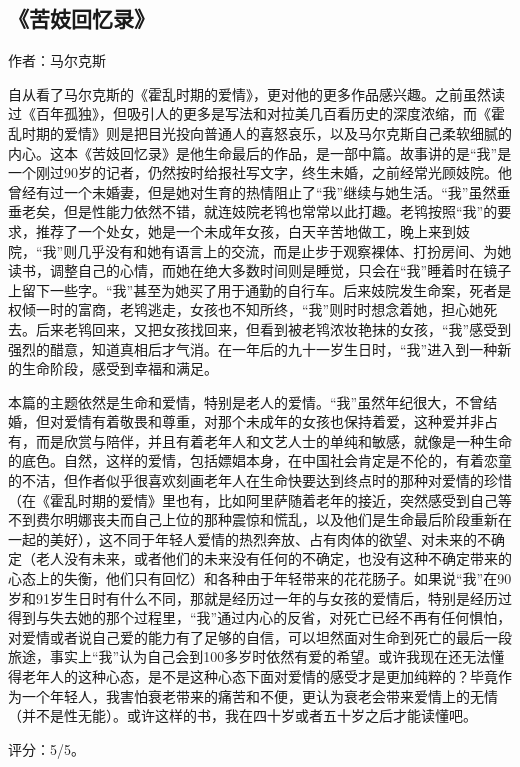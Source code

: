 \subsection{《苦妓回忆录》}

作者：马尔克斯

自从看了马尔克斯的《霍乱时期的爱情》，更对他的更多作品感兴趣。之前虽然读过《百年孤独》，但吸引人的更多是写法和对拉美几百看历史的深度浓缩，而《霍乱时期的爱情》则是把目光投向普通人的喜怒哀乐，以及马尔克斯自己柔软细腻的内心。这本《苦妓回忆录》是他生命最后的作品，是一部中篇。故事讲的是“我”是一个刚过90岁的记者，仍然按时给报社写文字，终生未婚，之前经常光顾妓院。他曾经有过一个未婚妻，但是她对生育的热情阻止了“我”继续与她生活。“我”虽然垂垂老矣，但是性能力依然不错，就连妓院老鸨也常常以此打趣。老鸨按照“我”的要求，推荐了一个处女，她是一个未成年女孩，白天辛苦地做工，晚上来到妓院，“我”则几乎没有和她有语言上的交流，而是止步于观察裸体、打扮房间、为她读书，调整自己的心情，而她在绝大多数时间则是睡觉，只会在“我”睡着时在镜子上留下一些字。“我”甚至为她买了用于通勤的自行车。后来妓院发生命案，死者是权倾一时的富商，老鸨逃走，女孩也不知所终，“我”则时时想念着她，担心她死去。后来老鸨回来，又把女孩找回来，但看到被老鸨浓妆艳抹的女孩，“我”感受到强烈的醋意，知道真相后才气消。在一年后的九十一岁生日时，“我”进入到一种新的生命阶段，感受到幸福和满足。

本篇的主题依然是生命和爱情，特别是老人的爱情。“我”虽然年纪很大，不曾结婚，但对爱情有着敬畏和尊重，对那个未成年的女孩也保持着爱，这种爱并非占有，而是欣赏与陪伴，并且有着老年人和文艺人士的单纯和敏感，就像是一种生命的底色。自然，这样的爱情，包括嫖娼本身，在中国社会肯定是不伦的，有着恋童的不洁，但作者似乎很喜欢刻画老年人在生命快要达到终点时的那种对爱情的珍惜（在《霍乱时期的爱情》里也有，比如阿里萨随着老年的接近，突然感受到自己等不到费尔明娜丧夫而自己上位的那种震惊和慌乱，以及他们是生命最后阶段重新在一起的美好），这不同于年轻人爱情的热烈奔放、占有肉体的欲望、对未来的不确定（老人没有未来，或者他们的未来没有任何的不确定，也没有这种不确定带来的心态上的失衡，他们只有回忆）和各种由于年轻带来的花花肠子。如果说“我”在90岁和91岁生日时有什么不同，那就是经历过一年的与女孩的爱情后，特别是经历过得到与失去她的那个过程里，“我”通过内心的反省，对死亡已经不再有任何惧怕，对爱情或者说自己爱的能力有了足够的自信，可以坦然面对生命到死亡的最后一段旅途，事实上“我”认为自己会到100多岁时依然有爱的希望。或许我现在还无法懂得老年人的这种心态，是不是这种心态下面对爱情的感受才是更加纯粹的？毕竟作为一个年轻人，我害怕衰老带来的痛苦和不便，更认为衰老会带来爱情上的无情（并不是性无能）。或许这样的书，我在四十岁或者五十岁之后才能读懂吧。

评分：5/5。